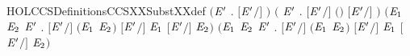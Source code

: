 \begin{SaveVerbatim}{HOLCCSDefinitionsCCSXXSubstXXdef}
\HOLTokenTurnstile{} \ensuremath{(}\HOLSymConst{\HOLTokenForall{}}\ensuremath{\HOLBoundVar{E}\sp{\prime}} . \ensuremath{[}\ensuremath{\HOLBoundVar{E}\sp{\prime}}\ensuremath{/}\ensuremath{]}  \HOLSymConst{\ensuremath{=}} \ensuremath{)} \HOLSymConst{\HOLTokenConj{}}
   \ensuremath{(}\HOLSymConst{\HOLTokenForall{}}  \ensuremath{\HOLBoundVar{E}\sp{\prime}} . \ensuremath{[}\ensuremath{\HOLBoundVar{E}\sp{\prime}}\ensuremath{/}\ensuremath{]} \ensuremath{(}\HOLSymConst{\ensuremath{\ldotp}}\ensuremath{)} \HOLSymConst{\ensuremath{=}} \HOLSymConst{\ensuremath{\ldotp}}\ensuremath{[}\ensuremath{\HOLBoundVar{E}\sp{\prime}}\ensuremath{/}\ensuremath{]} \ensuremath{)} \HOLSymConst{\HOLTokenConj{}}
   \ensuremath{(}\HOLSymConst{\HOLTokenForall{}}\ensuremath{\HOLBoundVar{E}\sb{\mathrm{1}}} \ensuremath{\HOLBoundVar{E}\sb{\mathrm{2}}} \ensuremath{\HOLBoundVar{E}\sp{\prime}} . \ensuremath{[}\ensuremath{\HOLBoundVar{E}\sp{\prime}}\ensuremath{/}\ensuremath{]} \ensuremath{(}\ensuremath{\HOLBoundVar{E}\sb{\mathrm{1}}} \HOLSymConst{\ensuremath{+}} \ensuremath{\HOLBoundVar{E}\sb{\mathrm{2}}}\ensuremath{)} \HOLSymConst{\ensuremath{=}} \ensuremath{[}\ensuremath{\HOLBoundVar{E}\sp{\prime}}\ensuremath{/}\ensuremath{]} \ensuremath{\HOLBoundVar{E}\sb{\mathrm{1}}} \HOLSymConst{\ensuremath{+}} \ensuremath{[}\ensuremath{\HOLBoundVar{E}\sp{\prime}}\ensuremath{/}\ensuremath{]} \ensuremath{\HOLBoundVar{E}\sb{\mathrm{2}}}\ensuremath{)} \HOLSymConst{\HOLTokenConj{}}
   \ensuremath{(}\HOLSymConst{\HOLTokenForall{}}\ensuremath{\HOLBoundVar{E}\sb{\mathrm{1}}} \ensuremath{\HOLBoundVar{E}\sb{\mathrm{2}}} \ensuremath{\HOLBoundVar{E}\sp{\prime}} . \ensuremath{[}\ensuremath{\HOLBoundVar{E}\sp{\prime}}\ensuremath{/}\ensuremath{]} \ensuremath{(}\ensuremath{\HOLBoundVar{E}\sb{\mathrm{1}}} \HOLSymConst{\ensuremath{\mid}} \ensuremath{\HOLBoundVar{E}\sb{\mathrm{2}}}\ensuremath{)} \HOLSymConst{\ensuremath{=}} \ensuremath{[}\ensuremath{\HOLBoundVar{E}\sp{\prime}}\ensuremath{/}\ensuremath{]} \ensuremath{\HOLBoundVar{E}\sb{\mathrm{1}}} \HOLSymConst{\ensuremath{\mid}} \ensuremath{[}\ensuremath{\HOLBoundVar{E}\sp{\prime}}\ensuremath{/}\ensuremath{]} \ensuremath{\HOLBoundVar{E}\sb{\mathrm{2}}}\ensuremath{)} \HOLSymConst{\HOLTokenConj{}}

\end{SaveVerbatim}

